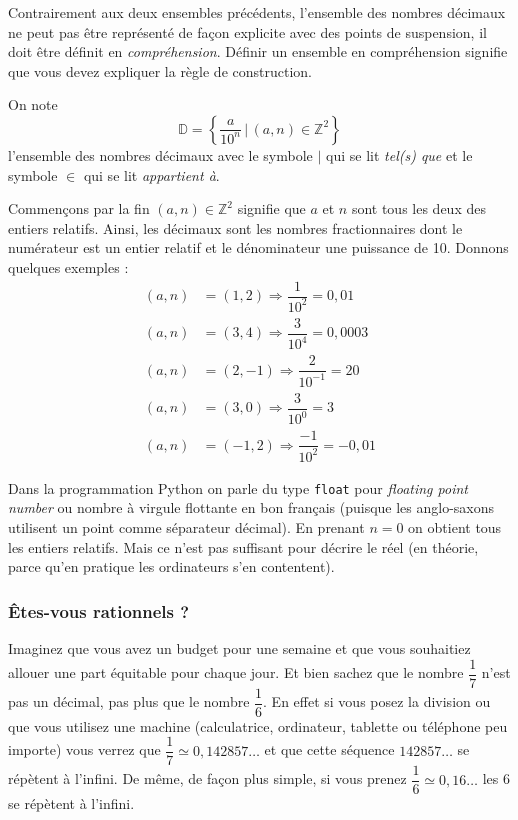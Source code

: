 \documentclass[a4paper, 11pt, twoside]{article}
\newcommand{\E}[1]{\mathbb{#1}}
\begin{document}
Contrairement aux deux ensembles précédents, l'ensemble des nombres
décimaux ne peut pas être représenté de façon explicite avec des
points de suspension, il doit être définit en
\emph{compréhension}. Définir un ensemble en compréhension signifie que
vous devez expliquer la règle de construction.

On note \[\E{D} = \left\{ \dfrac{a}{10^n}\,|\,(a, n)\in\E{Z}^2\right\}\]
l'ensemble des nombres décimaux avec le symbole \(|\) qui se lit
\emph{tel(s) que} et le symbole \(\in\) qui se lit \emph{appartient à}.

Commençons par la fin \((a, n)\in\E{Z}^2\) signifie que \(a\) et
\(n\) sont tous les deux des entiers relatifs. Ainsi, les décimaux
sont les nombres fractionnaires dont le numérateur est un entier
relatif et le dénominateur une puissance de 10. Donnons quelques
exemples :
\begin{align*}
(a, n) &= (1, 2)\Rightarrow \dfrac{1}{10^2} = 0,01\\
(a, n) &= (3, 4)\Rightarrow \dfrac{3}{10^4} = 0,0003\\
(a, n) &= (2, -1)\Rightarrow \dfrac{2}{10^{-1}} = 20\\
(a, n) &= (3, 0)\Rightarrow \dfrac{3}{10^0} = 3\\
(a, n) &= (-1, 2)\Rightarrow \dfrac{-1}{10^2} = -0,01
\end{align*}

Dans la programmation Python on parle du type \texttt{float} pour
\emph{floating point number} ou nombre à virgule flottante en bon
français (puisque les anglo-saxons utilisent un point comme
séparateur décimal). En prenant \(n = 0\) on obtient tous les entiers
relatifs. Mais ce n'est pas suffisant pour décrire le réel (en
théorie, parce qu'en pratique les ordinateurs s'en contentent).

\subsubsection{Êtes-vous rationnels ?}
\label{sec:org59033ce}

Imaginez que vous avez un budget pour une semaine et que vous
souhaitiez allouer une part équitable pour chaque jour. Et bien
sachez que le nombre \(\dfrac{1}{7}\) n'est pas un décimal, pas plus
que le nombre \(\dfrac{1}{6}\). En effet si vous posez la division ou
que vous utilisez une machine (calculatrice, ordinateur, tablette
ou téléphone peu importe) vous verrez que \(\dfrac{1}{7} \simeq
   0,142857\dots\) et que cette séquence \(142857\dots\) se répètent à
l'infini. De même, de façon plus simple, si vous prenez
\(\dfrac{1}{6} \simeq 0,16\dots\) les 6 se répètent à l'infini.
\end{document}
